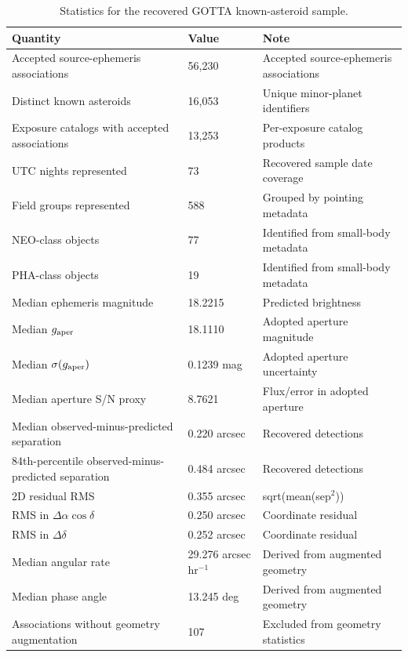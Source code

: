 \begin{table}[!htbp]
\centering
\caption{Statistics for the recovered GOTTA known-asteroid sample.}
\label{tab:summary}
\footnotesize
\setlength{\tabcolsep}{6pt}
\renewcommand{\arraystretch}{1.12}
\begin{tabular}{p{}p{}p{}}
\toprule
Quantity & Value & Note \\
\midrule
Accepted source-ephemeris associations & 56,230 & Accepted source-ephemeris associations \\
Distinct known asteroids & 16,053 & Unique minor-planet identifiers \\
Exposure catalogs with accepted associations & 13,253 & Per-exposure catalog products \\
UTC nights represented & 73 & Recovered sample date coverage \\
Field groups represented & 588 & Grouped by pointing metadata \\
NEO-class objects & 77 & Identified from small-body metadata \\
PHA-class objects & 19 & Identified from small-body metadata \\
Median ephemeris magnitude & 18.2215 & Predicted brightness \\
Median $g_{\rm aper}$ & 18.1110 & Adopted aperture magnitude \\
Median $\sigma(g_{\rm aper})$ & 0.1239 mag & Adopted aperture uncertainty \\
Median aperture S/N proxy & 8.7621 & Flux/error in adopted aperture \\
Median observed-minus-predicted separation & 0.220 arcsec & Recovered detections \\
84th-percentile observed-minus-predicted separation & 0.484 arcsec & Recovered detections \\
2D residual RMS & 0.355 arcsec & sqrt(mean(sep$^2$)) \\
RMS in $\Delta\alpha\cos\delta$ & 0.250 arcsec & Coordinate residual \\
RMS in $\Delta\delta$ & 0.252 arcsec & Coordinate residual \\
Median angular rate & 29.276 arcsec hr$^{-1}$ & Derived from augmented geometry \\
Median phase angle & 13.245 deg & Derived from augmented geometry \\
Associations without geometry augmentation & 107 & Excluded from geometry statistics \\
\bottomrule
\end{tabular}
\end{table}
